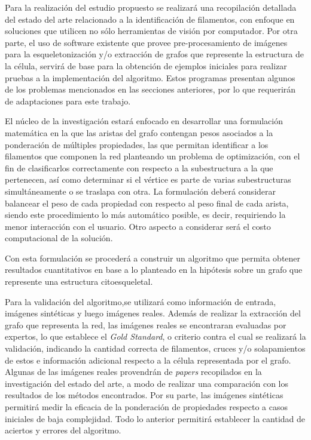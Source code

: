 \documentclass{article}
\begin{document}
Para la realizaci\'on del estudio propuesto se realizar\'a una recopilaci\'on detallada del estado del arte relacionado a la identificaci\'on de filamentos, con enfoque en soluciones que utilicen no s\'olo herramientas de visi\'on por computador.
Por otra parte, el uso de software existente que provee pre-procesamiento de im\'agenes para la esqueletonizaci\'on y/o extracción de grafos que represente la estructura de la c\'elula, servir\'a de base para la obtenci\'on de ejemplos iniciales para realizar pruebas a la implementaci\'on del algoritmo. Estos programas presentan algunos de los problemas mencionados en las secciones anteriores, por lo que requerir\'an de adaptaciones para este trabajo.  

El n\'ucleo de la investigaci\'on estar\'a enfocado en desarrollar una formulaci\'on matem\'atica en la que las aristas del grafo contengan pesos asociados a la ponderaci\'on de m\'ultiples propiedades, las que permitan identificar a los filamentos que componen la red planteando un problema de optimizaci\'on, con el fin de clasificarlos correctamente con respecto a la subestructura a la que pertenecen, as\'i como determinar si el v\'ertice es parte de varias subestructuras simult\'aneamente o se traslapa con otra.
La formulaci\'on deber\'a considerar balancear el peso de cada propiedad con respecto al peso final de cada arista, siendo este procedimiento lo m\'as autom\'atico posible, es decir, requiriendo la menor interacci\'on con el usuario. Otro aspecto a considerar ser\'a el costo computacional de la soluci\'on.

Con esta formulaci\'on se proceder\'a a construir un algoritmo que permita obtener resultados cuantitativos en base a lo planteado en la hip\'otesis sobre un grafo que represente una estructura citoesqueletal. 


Para la validaci\'on del algoritmo,se utilizar\'a como informaci\'on de entrada, im\'agenes sint\'eticas y luego im\'agenes reales. Adem\'as de realizar la extracci\'on del grafo que representa la red, las im\'agenes reales se encontraran evaluadas por expertos, lo que establece el \textit{Gold Standard}, o criterio contra el cual se realizar\'a la validaci\'on, indicando la cantidad correcta de filamentos, cruces y/o solapamientos de estos e informaci\'on adicional respecto a la c\'elula representada por el grafo.
Algunas de las im\'agenes reales provendr\'an de {\it papers} recopilados en la investigaci\'on del estado del arte, a modo de realizar una comparaci\'on con los resultados de los m\'etodos encontrados. Por su parte, las im\'agenes sint\'eticas permitir\'a medir la eficacia de la ponderaci\'on de propiedades respecto a casos iniciales de baja complejidad. Todo lo anterior permitir\'a establecer la cantidad de aciertos y errores del algoritmo.
\end{document}
